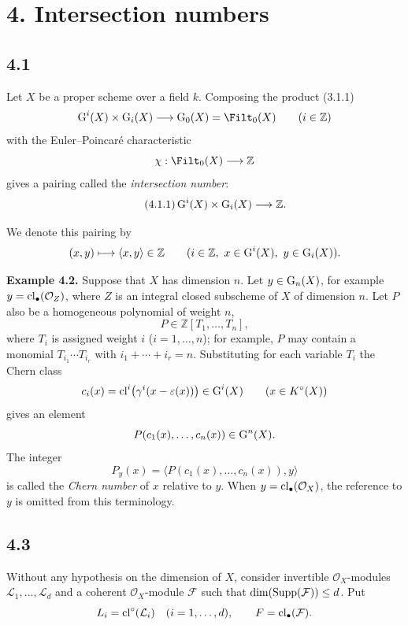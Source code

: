 \section*{4. Intersection numbers}

\subsection*{4.1}
Let $X$ be a proper scheme over a field $k$. Composing the product (3.1.1)
\[
\Gr^i(X)\times\Gr_i(X)\longrightarrow\Gr_0(X)=\Filt_0(X)
\qquad(i\in\mathbb Z)
\]
with the Euler--Poincar\'e characteristic
\[
\chi:\Filt_0(X)\longrightarrow\mathbb Z
\]
gives a pairing called the \emph{intersection number}:
\begin{equation}\tag{4.1.1}
\operatorname{G}^i(X)\times\operatorname{G}_i(X)\longrightarrow\mathbb Z.
\end{equation}

We denote this pairing by
\[
(x,y)\longmapsto\langle x,y\rangle\in\mathbb Z
\qquad(i\in\mathbb Z,\ x\in\operatorname{G}^i(X),\ y\in\operatorname{G}_i(X)).
\]

\textbf{Example 4.2.}
Suppose that $X$ has dimension $n$. Let $y\in\operatorname{G}_n(X)$, for example
$y=\operatorname{cl}_\bullet(\mathcal O_Z)$, where $Z$ is an integral closed subscheme of
$X$ of dimension $n$. Let $P$ also be a homogeneous polynomial of weight $n$,
\[
P\in\mathbb Z[T_1,\ldots,T_n],
\]
where $T_i$ is assigned weight $i$ ($i=1,\ldots,n$); for example, $P$ may
contain a monomial $T_{i_1}\cdots T_{i_r}$ with
$i_1+\cdots+i_r=n$. Substituting for each variable $T_i$ the Chern class
\[
c_i(x)=\operatorname{cl}^i\bigl(\gamma^i(x-\varepsilon(x))\bigr)\in\operatorname{G}^i(X)
\qquad(x\in K^\circ(X))
\]
gives an element
\[
P(c_1(x),\ldots,c_n(x))\in\operatorname{G}^n(X).
\]
The integer
\[
P_y(x)=\bigl\langle P(c_1(x),\ldots,c_n(x)),y\bigr\rangle
\]
is called the \emph{Chern number} of $x$ relative to $y$. When
$y=\operatorname{cl}_\bullet(\mathcal O_X)$, the reference to $y$ is omitted from this
terminology.

\subsection*{4.3}
Without any hypothesis on the dimension of $X$, consider invertible
$\mathcal O_X$-modules $\mathcal L_1,\ldots,\mathcal L_d$ and a coherent
$\mathcal O_X$-module $\mathcal F$ such that
$\dim(\operatorname{Supp}(\mathcal F))\leq d$. Put
\[
L_i=\operatorname{cl}^\circ(\mathcal L_i)\quad(i=1,\ldots,d),
\qquad F=\operatorname{cl}_\bullet(\mathcal F).
\]

